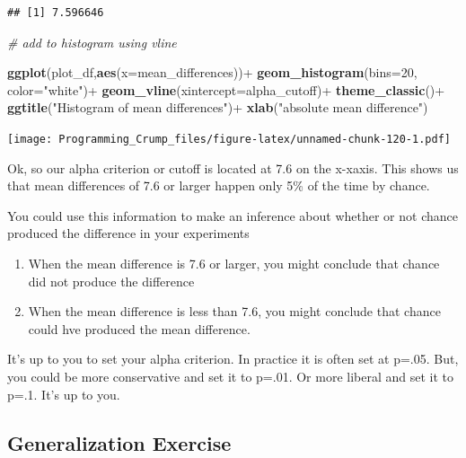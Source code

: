 \documentclass[]{book}
\newenvironment{Shaded}{\begin{snugshade}}{\end{snugshade}}
\newcommand{\KeywordTok}[1]{\textcolor[rgb]{0.13,0.29,0.53}{\textbf{{#1}}}}
\newcommand{\DataTypeTok}[1]{\textcolor[rgb]{0.13,0.29,0.53}{{#1}}}
\newcommand{\DecValTok}[1]{\textcolor[rgb]{0.00,0.00,0.81}{{#1}}}
\newcommand{\StringTok}[1]{\textcolor[rgb]{0.31,0.60,0.02}{{#1}}}
\newcommand{\CommentTok}[1]{\textcolor[rgb]{0.56,0.35,0.01}{\textit{{#1}}}}
\newcommand{\NormalTok}[1]{{#1}}
\theoremstyle{definition}
\theoremstyle{definition}
\theoremstyle{definition}
\theoremstyle{remark}
\begin{document}
\begin{verbatim}
## [1] 7.596646
\end{verbatim}

\begin{Shaded}
\begin{Highlighting}[]
\CommentTok{# add to histogram using vline}

\KeywordTok{ggplot}\NormalTok{(plot_df,}\KeywordTok{aes}\NormalTok{(}\DataTypeTok{x=}\NormalTok{mean_differences))+}
\StringTok{  }\KeywordTok{geom_histogram}\NormalTok{(}\DataTypeTok{bins=}\DecValTok{20}\NormalTok{, }\DataTypeTok{color=}\StringTok{"white"}\NormalTok{)+}
\StringTok{  }\KeywordTok{geom_vline}\NormalTok{(}\DataTypeTok{xintercept=}\NormalTok{alpha_cutoff)+}
\StringTok{  }\KeywordTok{theme_classic}\NormalTok{()+}
\StringTok{  }\KeywordTok{ggtitle}\NormalTok{(}\StringTok{"Histogram of mean differences"}\NormalTok{)+}
\StringTok{  }\KeywordTok{xlab}\NormalTok{(}\StringTok{"absolute mean difference"}\NormalTok{)}
\end{Highlighting}
\end{Shaded}

\texttt{[image: Programming\_Crump\_files/figure-latex/unnamed-chunk-120-1.pdf]}

Ok, so our alpha criterion or cutoff is located at 7.6 on the x-xaxis.
This shows us that mean differences of 7.6 or larger happen only 5\% of
the time by chance.

You could use this information to make an inference about whether or not
chance produced the difference in your experiments

\begin{enumerate}
\def\labelenumi{\arabic{enumi}.}
\item
  When the mean difference is 7.6 or larger, you might conclude that
  chance did not produce the difference
\item
  When the mean difference is less than 7.6, you might conclude that
  chance could hve produced the mean difference.
\end{enumerate}

It's up to you to set your alpha criterion. In practice it is often set
at p=.05. But, you could be more conservative and set it to p=.01. Or
more liberal and set it to p=.1. It's up to you.

\subsection{Generalization Exercise}\label{generalization-exercise-3}
\end{document}
